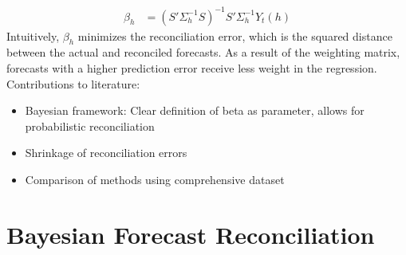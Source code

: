\documentclass[a4paper,fleqn,11pt]{article}
\begin{document}
\begin{align}
\label{eq:reg}
\beta_{h} &= \left(S'\Sigma_h^{-1}S \right)^{-1} S'\Sigma_h^{-1}Y_t(h)
\end{align}
Intuitively, $\beta_h$ minimizes the reconciliation error, which is the squared distance between the actual and reconciled forecasts. As a result of the weighting matrix, forecasts with a higher prediction error receive less weight in the regression.\\


Contributions to literature:
\begin{itemize}
	\item Bayesian framework: Clear definition of beta as parameter, allows for probabilistic reconciliation
	\item Shrinkage of reconciliation errors
	\item Comparison of methods using comprehensive dataset
\end{itemize}

\clearpage

\section{Bayesian Forecast Reconciliation}
\end{document}
